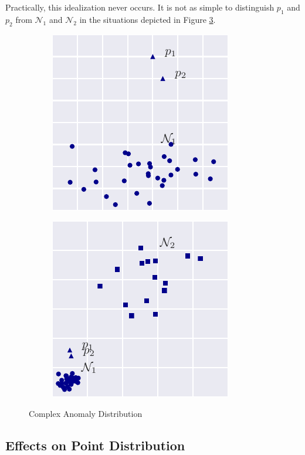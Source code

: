 Practically, this idealization never occurs. It is not as simple to distinguish $p_1$ and $p_2$ from $\mathcal{N}_1$ and $\mathcal{N}_2$ in the situations depicted in Figure \ref{fig:hard_dist}.

\begin{figure}[H]
  \centering
  \begin{subfigure}[H]{2in}
    \includegraphics{figs/hard1_dist.pdf}
    \caption{}
    \label{fig:hard1_dist}
  \end{subfigure}
  \begin{subfigure}[H]{2in}
    \includegraphics{figs/hard2_dist.pdf}
    \caption{}
    \label{fig:hard2_dist}
  \end{subfigure}
  \caption{Complex Anomaly Distribution}
  \label{fig:hard_dist}
\end{figure}


\subsection{Effects on Point Distribution}

